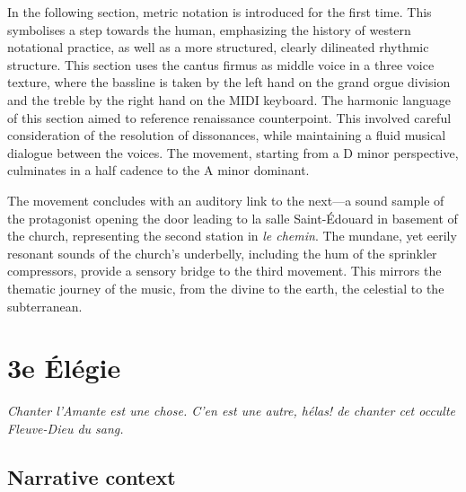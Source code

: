 \documentclass[12pt,twoside,maitrise]{dms_ks}
\theoremstyle{definition}
\begin{document}
In the following section, metric notation is introduced for the first time.
This symbolises a step towards the human, emphasizing the history of western notational practice, as well as a more structured, clearly dilineated rhythmic structure. 
This section uses the cantus firmus as middle voice in a three voice texture, where the bassline is taken by the left hand on the grand orgue division and the treble by the right hand on the MIDI keyboard.
The harmonic language of this section aimed to reference renaissance counterpoint.
This involved careful consideration of the resolution of dissonances, while maintaining a fluid musical dialogue between the voices.
The movement, starting from a D minor perspective, culminates in a half cadence to the A minor dominant.


The movement concludes with an auditory link to the next---a sound sample of the protagonist opening the door leading to la salle Saint-Édouard in basement of the church, representing the second station in \textit{le chemin}.
The mundane, yet eerily resonant sounds of the church's underbelly, including the hum of  the sprinkler compressors, provide a sensory bridge to the third movement.
This mirrors the thematic journey of the music, from the divine to the earth, the celestial to the subterranean.


\section{3e Élégie}

\epigraph{\textit{Chanter l'Amante est une chose. C'en est une autre, hélas! de chanter cet occulte Fleuve-Dieu du sang.}}{}

\subsection{Narrative context}
\end{document}
